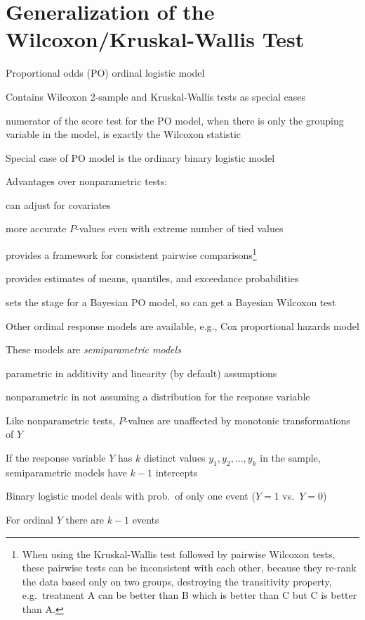 \section{Generalization of the Wilcoxon/Kruskal-Wallis Test}
\bi
\item Proportional odds (PO) ordinal logistic model
\item Contains Wilcoxon 2-sample and Kruskal-Wallis tests as special cases
 \bi
 \item numerator of the score test for the PO model, when there is only the grouping variable in the model, is exactly the Wilcoxon statistic
 \ei
\item Special case of PO model is the ordinary binary logistic model
\item Advantages over nonparametric tests:
 \bi
 \item can adjust for covariates
 \item more accurate $P$-values even with extreme number of tied values
 \item provides a framework for consistent pairwise comparisons\footnote{When using the Kruskal-Wallis test followed by pairwise Wilcoxon tests, these pairwise tests can be inconsistent with each other, because they re-rank the data based only on two groups, destroying the transitivity property, e.g.\ treatment A can be better than B which is better than C but C is better than A.}
 \item provides estimates of means, quantiles, and exceedance probabilities
 \item sets the stage for a Bayesian PO model, so can get a Bayesian Wilcoxon test
 \ei
\item Other ordinal response models are available, e.g., Cox proportional hazards model
\item These models are \emph{semiparametric models}
 \bi
 \item parametric in additivity and linearity (by default) assumptions
 \item nonparametric in not assuming a distribution for the response variable
 \ei
\item Like nonparametric tests, $P$-values are unaffected by monotonic transformations of $Y$
\item If the response variable $Y$ has $k$ distinct values $y_1, y_2, \dots, y_k$ in the sample, semiparametric models have $k-1$ intercepts
\item Binary logistic model deals with prob.\ of only one event ($Y=1$ vs.\ $Y=0$)
\item For ordinal $Y$ there are $k-1$ events
